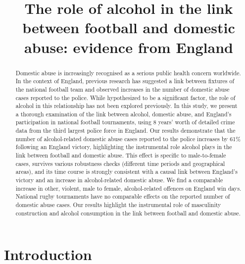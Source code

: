 \documentclass[12pt, a4paper]{article}
\title{}
\author{}
\date{}
\begin{document}
\title{The role of alcohol in the link between football and domestic abuse: evidence from England}


\maketitle 
\begin{abstract}
\noindent


Domestic abuse is increasingly recognised as a serious public health concern worldwide. In the context of England, previous research has suggested a link between fixtures of the national football team and observed increases in the number of domestic abuse cases reported to the police. While hypothesized to be a significant factor, the role of alcohol in this relationship has not been explored previously. In this study, we present a thorough examination of the link between alcohol, domestic abuse, and England's participation in national football tournaments, using 8 years' worth of detailed crime data from the third largest police force in England. Our results demonstrate that the number of alcohol-related domestic abuse cases reported to the police increases by 61\% following an England victory, highlighting the instrumental role alcohol plays in the link between football and domestic abuse. This effect is specific to male-to-female cases, survives various robustness checks (different time periods and geographical areas), and its time course is strongly consistent with a causal link between England's victory and an increase in alcohol-related domestic abuse. We find a comparable increase in other, violent, male to female, alcohol-related offences on England win days. National rugby tournaments have no comparable effects on the reported number of domestic abuse cases. Our results highlight the instrumental role of masculinity construction and alcohol consumption in the link between football and domestic abuse.
\end{abstract}


\doublespacing


\newpage
\RaggedRight
\section*{Introduction}

\end{document}
